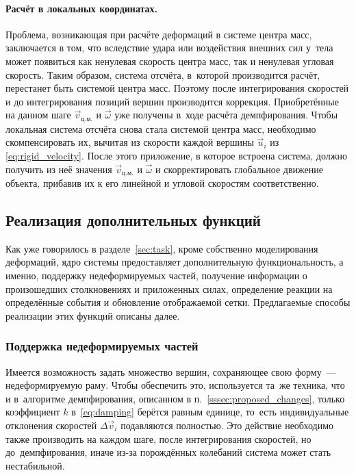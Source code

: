 \documentclass[a4paper, 14pt, titlepage]{extarticle}
\newcommand{\vect}[1]{\vec{#1}} %
\begin{document}
        \paragraph{Расчёт в локальных координатах.} Проблема, возникающая при расчёте деформаций в
        системе центра масс, заключается в том, что вследствие удара или воздействия внешних сил
        у~тела может появиться как ненулевая скорость центра масс, так и ненулевая угловая скорость.
        Таким образом, система отсчёта, в~которой производится расчёт, перестанет быть системой центра
        масс. Поэтому после интегрирования скоростей и до интегрирования позиций вершин производится
        коррекция. Приобретённые на данном шаге $\vect{v}_{ц.м.}$ и $\vect{\omega}$ уже получены
        в~ходе расчёта демпфирования. Чтобы локальная система отсчёта снова стала системой центра масс,
        необходимо скомпенсировать их, вычитая из скорости каждой вершины $\vect{u}_i$ из \eqref{eq:rigid_velocity}.
        После этого приложение, в которое встроена система, должно получить из неё значения
        $\vect{v}_{ц.м.}$ и $\vect{\omega}$ и скорректировать глобальное движение объекта, прибавив их
        к его линейной и угловой скоростям соответственно.

    \subsection{Реализация дополнительных функций}

      Как уже говорилось в разделе~\ref{sec:task}, кроме собственно моделирования деформаций, ядро
      системы предоставляет дополнительную функциональность, а именно, поддержку недеформируемых
      частей, получение информации о произошедших столкновениях и приложенных силах, определение
      реакции на определённые события и обновление отображаемой сетки. Предлагаемые способы
      реализации этих функций описаны далее.

      \subsubsection{Поддержка недеформируемых частей}

        Имеется возможность задать множество вершин, сохраняющее свою форму~--- недеформируемую раму.
        Чтобы обеспечить это, используется та~же техника, что и в~алгоритме демпфирования,
        описанном в п.~\ref{sssec:proposed_changes}, только коэффициент $k$ в~\eqref{eq:damping}
        берётся равным единице, то~есть индивидуальные отклонения скоростей $\Delta \vect{v}_i$
        подавляются полностью. Это действие необходимо также производить на каждом шаге, после
        интегрирования скоростей, но до~демпфирования, иначе из-за порождённых колебаний система
        может стать нестабильной.
\end{document}
